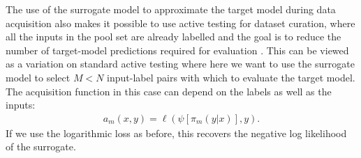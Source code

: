 The use of the surrogate model to approximate the target model during data acquisition also makes it possible to use active testing for dataset curation, where all the inputs in the pool set are already labelled and the goal is to reduce the number of target-model predictions required for evaluation \citep{maynez2023benchmarking,polo2024tinybenchmarks,saranathan2024dele,vivek2024anchor}.
This can be viewed as a variation on standard active testing where here we want to use the surrogate model to select $M < N$ input-label pairs with which to evaluate the target model.
The acquisition function in this case can depend on the labels as well as the inputs:
\begin{align}\label{eq:label_aware_acq_fn}
    a_m(x,y) = \ell(\psi[\pi_m(y|x)], y)
    .
\end{align}
If we use the logarithmic loss as before, this recovers the negative log likelihood of the surrogate.